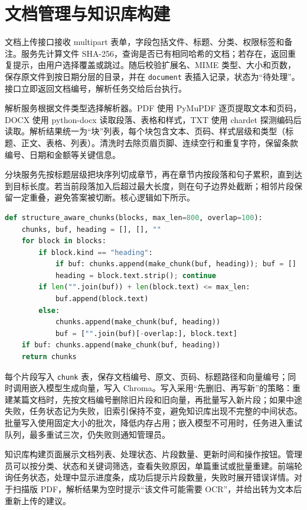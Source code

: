 \section{文档管理与知识库构建}
\label{sec:doc-impl}

文档上传接口接收 multipart 表单，字段包括文件、标题、分类、权限标签和备注。服务先计算文件 SHA-256，查询是否已有相同哈希的文档；若存在，返回重复提示，由用户选择覆盖或跳过。随后校验扩展名、MIME 类型、大小和页数，保存原文件到按日期分层的目录，并在 \texttt{document} 表插入记录，状态为“待处理”。接口立即返回文档编号，解析任务交给后台执行。

解析服务根据文件类型选择解析器。PDF 使用 PyMuPDF 逐页提取文本和页码，DOCX 使用 python-docx 读取段落、表格和样式，TXT 使用 chardet 探测编码后读取。解析结果统一为“块”列表，每个块包含文本、页码、样式层级和类型（标题、正文、表格、列表）。清洗时去除页眉页脚、连续空行和重复字符，保留条款编号、日期和金额等关键信息。

分块服务先按标题层级把块序列切成章节，再在章节内按段落和句子累积，直到达到目标长度。若当前段落加入后超过最大长度，则在句子边界处截断；相邻片段保留一定重叠，避免答案被切断。核心逻辑如下所示。

\begingroup\linespread{1.0}\selectfont
\begin{lstlisting}[language=Python]
def structure_aware_chunks(blocks, max_len=800, overlap=100):
    chunks, buf, heading = [], [], ""
    for block in blocks:
        if block.kind == "heading":
            if buf: chunks.append(make_chunk(buf, heading)); buf = []
            heading = block.text.strip(); continue
        if len("".join(buf)) + len(block.text) <= max_len:
            buf.append(block.text)
        else:
            chunks.append(make_chunk(buf, heading))
            buf = ["".join(buf)[-overlap:], block.text]
    if buf: chunks.append(make_chunk(buf, heading))
    return chunks
\end{lstlisting}
\endgroup

每个片段写入 \texttt{chunk} 表，保存文档编号、原文、页码、标题路径和向量编号；同时调用嵌入模型生成向量，写入 Chroma。写入采用“先删旧、再写新”的策略：重建某篇文档时，先按文档编号删除旧片段和旧向量，再批量写入新片段；如果中途失败，任务状态记为失败，旧索引保持不变，避免知识库出现不完整的中间状态。批量写入使用固定大小的批次，降低内存占用；嵌入模型不可用时，任务进入重试队列，最多重试三次，仍失败则通知管理员。

知识库构建页面展示文档列表、处理状态、片段数量、更新时间和操作按钮。管理员可以按分类、状态和关键词筛选，查看失败原因，单篇重试或批量重建。前端轮询任务状态，处理中显示进度条，成功后提示片段数量，失败时展开错误详情。对于扫描版 PDF，解析结果为空时提示“该文件可能需要 OCR”，并给出转为文本后重新上传的建议。

